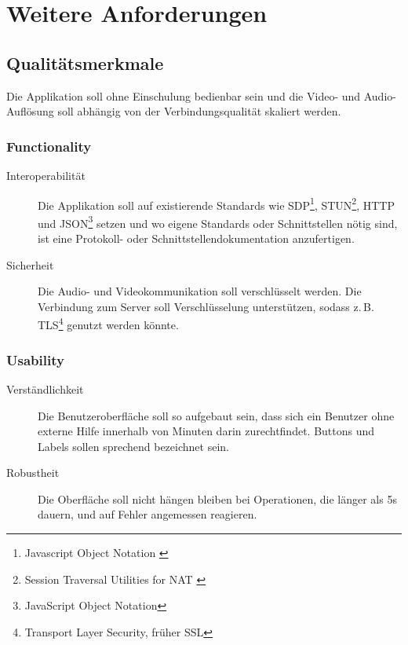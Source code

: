 \section{Weitere Anforderungen}

	\subsection{Qualitätsmerkmale}
	Die Applikation soll ohne Einschulung bedienbar sein und die Video- und Audio-Auflösung
	soll abhängig von der Verbindungsqualität skaliert werden.


		\subsubsection{Functionality}
		\begin{description}
			\item[Interoperabilität] Die Applikation soll auf existierende Standards wie 
			SDP\footnote{Javascript Object Notation \cite{IETF-JSON-RFC}}, 
			STUN\footnote{Session Traversal Utilities for NAT \cite{IETF-STUN-RFC}}, HTTP
			und JSON\footnote{JavaScript Object Notation\cite{IETF-JSON-RFC}} setzen und
			wo eigene Standards oder Schnittstellen nötig sind, ist eine Protokoll- oder Schnittstellendokumentation anzufertigen.
			\item[Sicherheit] Die Audio- und Videokommunikation soll verschlüsselt
			werden. Die Verbindung zum Server soll Verschlüsselung unterstützen, sodass
			z.\,B. TLS\footnote{Transport Layer Security, früher SSL} genutzt werden
			könnte.
		\end{description}

		\subsubsection{Usability}
		\begin{description}
			\item[Verständlichkeit] Die Benutzeroberfläche soll so aufgebaut sein, dass
			sich ein Benutzer ohne externe Hilfe innerhalb von Minuten darin
			zurechtfindet. Buttons und Labels sollen sprechend bezeichnet sein.
			\item[Robustheit] Die Oberfläche soll nicht hängen bleiben bei Operationen,
			die länger als 5s dauern, und auf Fehler angemessen reagieren.
		\end{description}

